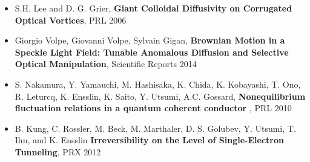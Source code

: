 \documentclass[12pt,fleqn]{seminar}
\begin{document}
\begin{itemize}


\item S.H. Lee and D. G. Grier, {\bf Giant Colloidal Diffusivity on Corrugated Optical Vortices}, PRL 2006 

\item Giorgio Volpe, Giovanni Volpe, Sylvain Gigan,
 {\bf Brownian Motion in a Speckle Light Field:
Tunable Anomalous Diffusion and
Selective Optical Manipulation}, Scientific Reports 2014

\item  S. Nakamura, Y. Yamauchi, M. Hashisaka, K. Chida, K.
Kobayashi, T. Ono, R. Leturcq, K. Ensslin, K. Saito, Y. Utsumi, A.C. Gossard, 
{\bf Nonequilibrium fluctuation relations in a quantum coherent conductor
}, PRL 2010

\item B. Kung, C. Rossler, M. Beck, M. Marthaler, D. S. Golubev, Y. Utsumi, T. Ihn, and K. Ensslin {\bf Irreversibility on the Level of Single-Electron Tunneling}, 
PRX 2012

\end{itemize}


\esl
\end{document}
